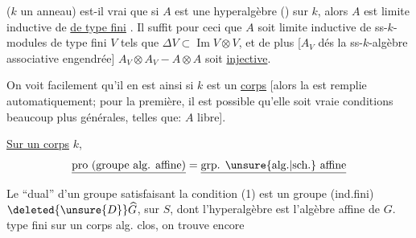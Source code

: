 
($k$ un anneau) est-il vrai que si $A$ est une hyperalgèbre () sur $k$, alors $A$  est limite inductive de  \uline{de type fini} . Il suffit pour ceci que $A$ soit limite inductive de ss-$k$-modules de type fini $V$ tels que $\Delta V\subset\operatorname{Im}V\otimes V$, et de plus [$A_V$ dés la ss-$k$-algèbre associative engendrée]  $A_V\otimes A_V\mathbin{-}A\otimes A$ soit \uline{injective}. 

On voit facilement qu'il en est ainsi si $k$ est un \uline{corps} [alors la   est remplie automatiquement; pour la première, il est possible qu'elle soit vraie   conditions beaucoup plus générales, telles que: $A$ libre].
\margin{$\unsure{\ast}$}

\uline{Sur un corps} $k$, 
\[
\underline{\text{pro (groupe alg. affine)}}=\underline{\text{grp. \unsure{alg.|sch.} affine}}
\]

Le ``dual'' d'un  groupe  satisfaisant la condition (1) est un groupe (ind.fini) $\deleted{\unsure{D}}\widehat G$, sur $S$, dont l'hyperalgèbre est l'algèbre affine de $G$.  type fini sur un corps alg. clos, on trouve encore
